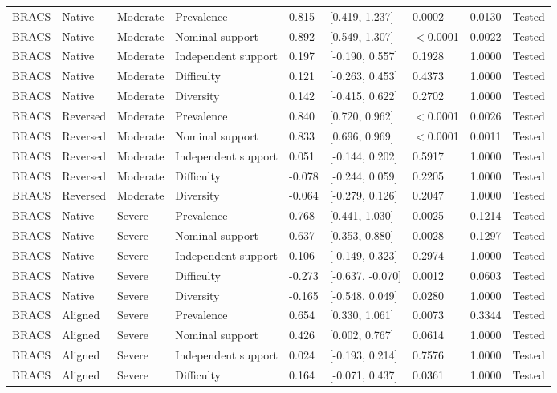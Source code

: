 \begin{longtable}{lllllllll}
BRACS & Native & Moderate & Prevalence & 0.815 & [0.419, 1.237] & 0.0002 & 0.0130 & Tested \\
BRACS & Native & Moderate & Nominal support & 0.892 & [0.549, 1.307] & $<$0.0001 & 0.0022 & Tested \\
BRACS & Native & Moderate & Independent support & 0.197 & [-0.190, 0.557] & 0.1928 & 1.0000 & Tested \\
BRACS & Native & Moderate & Difficulty & 0.121 & [-0.263, 0.453] & 0.4373 & 1.0000 & Tested \\
BRACS & Native & Moderate & Diversity & 0.142 & [-0.415, 0.622] & 0.2702 & 1.0000 & Tested \\
BRACS & Reversed & Moderate & Prevalence & 0.840 & [0.720, 0.962] & $<$0.0001 & 0.0026 & Tested \\
BRACS & Reversed & Moderate & Nominal support & 0.833 & [0.696, 0.969] & $<$0.0001 & 0.0011 & Tested \\
BRACS & Reversed & Moderate & Independent support & 0.051 & [-0.144, 0.202] & 0.5917 & 1.0000 & Tested \\
BRACS & Reversed & Moderate & Difficulty & -0.078 & [-0.244, 0.059] & 0.2205 & 1.0000 & Tested \\
BRACS & Reversed & Moderate & Diversity & -0.064 & [-0.279, 0.126] & 0.2047 & 1.0000 & Tested \\
BRACS & Native & Severe & Prevalence & 0.768 & [0.441, 1.030] & 0.0025 & 0.1214 & Tested \\
BRACS & Native & Severe & Nominal support & 0.637 & [0.353, 0.880] & 0.0028 & 0.1297 & Tested \\
BRACS & Native & Severe & Independent support & 0.106 & [-0.149, 0.323] & 0.2974 & 1.0000 & Tested \\
BRACS & Native & Severe & Difficulty & -0.273 & [-0.637, -0.070] & 0.0012 & 0.0603 & Tested \\
BRACS & Native & Severe & Diversity & -0.165 & [-0.548, 0.049] & 0.0280 & 1.0000 & Tested \\
BRACS & Aligned & Severe & Prevalence & 0.654 & [0.330, 1.061] & 0.0073 & 0.3344 & Tested \\
BRACS & Aligned & Severe & Nominal support & 0.426 & [0.002, 0.767] & 0.0614 & 1.0000 & Tested \\
BRACS & Aligned & Severe & Independent support & 0.024 & [-0.193, 0.214] & 0.7576 & 1.0000 & Tested \\
BRACS & Aligned & Severe & Difficulty & 0.164 & [-0.071, 0.437] & 0.0361 & 1.0000 & Tested \\

\end{longtable}
